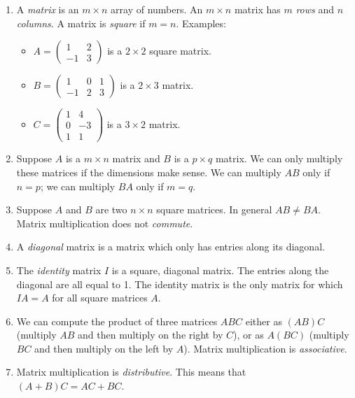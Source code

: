 \documentclass[11pt]{article}
\begin{document}
\begin{enumerate}
\item A \emph{matrix} is an $m \times n$ array of numbers. An $m\times n$ matrix has $m$ \emph{rows} and $n$ \emph{columns}. A matrix is \emph{square} if $m=n$.  Examples:
\begin{itemize}
\item $A = \begin{pmatrix} 1 & 2 \\ -1 & 3 \end{pmatrix}$ is a $2\times 2$ square matrix.
\item $B = \begin{pmatrix} 1 & 0 & 1 \\ -1 & 2 & 3 \end{pmatrix}$ is a $2\times 3$ matrix.
\item $C = \begin{pmatrix} 1 & 4  \\ 0 & -3  \\ 1 & 1 \end{pmatrix}$ is a $3\times 2$ matrix. 
\end{itemize}
\item Suppose $A$ is a $m\times n$ matrix and $B$ is a $p\times q$ matrix. We can only multiply these matrices if the dimensions make sense. We can multiply $AB$ only if $n=p$; we can multiply $BA$ only if $m=q$.
\item Suppose $A$ and $B$ are two $n\times n$ square matrices. In general $\boxed{AB \neq BA}$. Matrix multiplication does not \emph{commute}. 
\item A \emph{diagonal} matrix is a matrix which only has entries along its diagonal.
\item The \emph{identity} matrix $I$ is a square, diagonal matrix. The entries along the diagonal are all equal to 1. The identity matrix is the only matrix for which $IA=A$ for all square matrices $A$. 
\item We can compute the product of three matrices $ABC$ either as $(AB)C$ (multiply $AB$ and then multiply on the right by $C$), or as $A(BC)$ (multiply $BC$ and then multiply on the left by $A$). Matrix multiplication is \emph{associative}. 
\item Matrix multiplication is \emph{distributive}. This means that $(A+B)C = AC + BC$. 
\end{enumerate}
\end{document}
